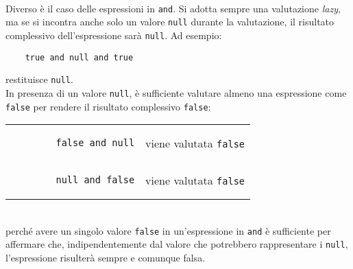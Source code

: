 \documentclass[12pt,a4paper]{book}
\begin{document}
	\paragraph{}Diverso è il caso delle espressioni in \texttt{and}. Si adotta sempre una valutazione \textit{lazy}, ma se si incontra anche solo un valore \texttt{null} durante la valutazione, il risultato complessivo dell'espressione sarà \texttt{null}. Ad esempio:
	\begin{lstlisting}
	true and null and true
	\end{lstlisting}
	restituisce \texttt{null}.\\In presenza di un valore \texttt{null}, è sufficiente valutare almeno una espressione come \texttt{false} per rendere il risultato complessivo \texttt{false}:\vspace{10px}\\
	\begin{tabular}{l l}
		\begin{lstlisting}
		false and null
		\end{lstlisting} & viene valutata \texttt{false}\\
		\begin{lstlisting}
		null and false
		\end{lstlisting} & viene valutata \texttt{false}\\
	\end{tabular}\vspace{10px}\\
	perché avere un singolo valore \texttt{false} in un'espressione in \texttt{and} è sufficiente per affermare che, indipendentemente dal valore che potrebbero rappresentare i \texttt{null}, l'espressione risulterà sempre e comunque falsa.
\end{document}
